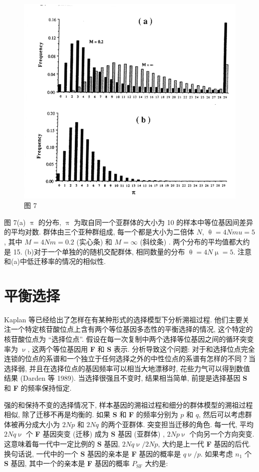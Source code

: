 \documentclass[
    12pt,%
    ]{article}
\begin{document}
\begin{figure}
\centering
\includegraphics{coalescent-process.images/image7.png}
\caption{图 7}
\end{figure}

图 7(a) $\uppi$ 的分布, $\uppi$ 为取自同一个亚群体的大小为 10 的样本中等位基因间差异的平均对数. 群体由三个亚种群组成,
每一个都是大小为二倍体 $N$, $\uptheta =4Nmu =5$, 其中 $M=4Nm=0.2$ (实心条) 和 $M=\mathrm{\infty}$ (斜纹条) .
两个分布的平均值都大约是 15. (b)对于一个单独的的随机交配群体, 相同数量的分布 $\uptheta =4N\upmu =5$.
注意和(a)中低迁移率的情况的相似性.

\section{平衡选择}

Kaplan 等已经给出了怎样在有某种形式的选择模型下分析溯祖过程.
他们主要关注一个特定核苷酸位点上含有两个等位基因多态性的平衡选择的情况, 这个特定的核苷酸位点为 ``选择位点''.
假设在每一次复制中两个选择等位基因之间的循环突变率为 $\upnu$, 这两个等位基因用 \textbf{F} 和 \textbf{S} 表示.
分析导致这个问题: 对于和选择位点完全连锁的位点的系谱和一个独立于任何选择之外的中性位点的系谱有怎样的不同？当选择弱,
并且在选择位点的基因频率可以相当大地漂移时, 花些力气可以得到数值结果 (Darden 等 1989). 当选择很强且不变时,
结果相当简单, 前提是选择基因 \textbf{S} 和 \textbf{F} 的频率保持恒定.

强的和保持不变的选择情况下, 样本基因的溯祖过程和细分的群体模型的溯祖过程相似, 除了迁移不再是均衡的. 如果 \textbf{S} 和
\textbf{F} 的频率分别为 $p$ 和 $q$, 然后可以考虑群体被再分成大小为 $2Np$ 和 $2Nq$ 的两个亚群体. 突变担当迁移的角色.
每一代, 平均 $2Nq\upnu$ 个 \textbf{F} 基因突变 (迁移) 成为 \textbf{S} 基因 (亚群体) , $2Np\upnu$
个向另一个方向突变. 这意味着每一代中一定比例的 \textbf{S} 基因, $2Nq\upnu/2Np$, 大约是上一代 \textbf{F}
基因的后代. 换句话说, 一代中的一个 \textbf{S} 基因的亲本是 \textbf{F} 基因的概率是 $q\upnu/p$. 如果考虑 $n_{1}$
个 \textbf{S} 基因, 其中一个的亲本是 \textbf{F} 基因的概率 $P_{\text{SF}}$ 大约是:
\end{document}
